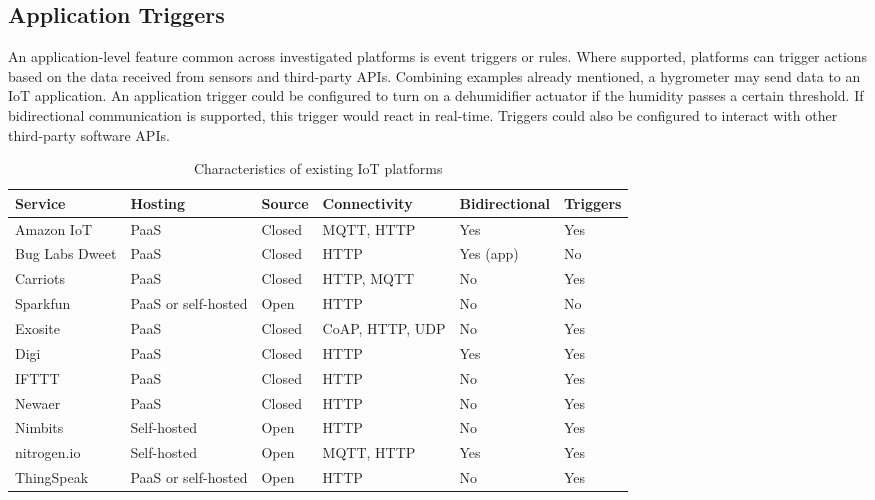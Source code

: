     \subsection{Application Triggers}
      An application-level feature common across investigated platforms is event triggers or rules. Where supported, platforms can trigger actions based on the data received from sensors and third-party APIs. Combining examples already mentioned, a hygrometer may send data to an IoT application. An application trigger could be configured to turn on a dehumidifier actuator if the humidity passes a certain threshold. If bidirectional communication is supported, this trigger would react in real-time. Triggers could also be configured to interact with other third-party software APIs.

      \begin{table}
        \scriptsize
        \begin{tabularx}{\textwidth}{|X|X|X|X|X|X|}
          \hline
          \textbf{Service} & \textbf{Hosting} & \textbf{Source} & \textbf{Connectivity} & \textbf{Bidirectional} & \textbf{Triggers} \\ \hline
          Amazon IoT & PaaS & Closed & MQTT, HTTP & Yes & Yes \\ \hline
          Bug Labs Dweet & PaaS & Closed & HTTP & Yes (app) & No \\ \hline
          Carriots & PaaS & Closed & HTTP, MQTT & No & Yes \\ \hline
          Sparkfun & PaaS or self-hosted & Open & HTTP & No & No \\ \hline
          Exosite & PaaS & Closed & CoAP, HTTP, UDP & No & Yes \\ \hline
          Digi & PaaS & Closed & HTTP & Yes & Yes \\ \hline
          IFTTT & PaaS & Closed & HTTP & No & Yes \\ \hline
          Newaer & PaaS & Closed & HTTP & No & Yes \\ \hline
          Nimbits & Self-hosted & Open & HTTP & No & Yes \\ \hline
          nitrogen.io & Self-hosted & Open & MQTT, HTTP & Yes & Yes \\ \hline
          ThingSpeak & PaaS or self-hosted & Open & HTTP & No & Yes \\ \hline
        \end{tabularx}
        \caption{Characteristics of existing IoT platforms}
        \label{platform-characteristics}
      \end{table}

